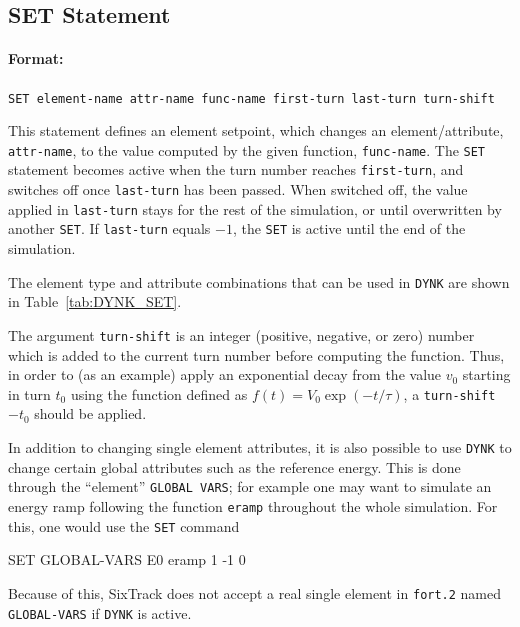 \subsection{SET Statement} \label{DYNK:SET}

\paragraph{Format:} \texttt{SET element-name attr-name func-name first-turn last-turn turn-shift}

\bigskip
This statement defines an element setpoint, which changes an element/attribute, \texttt{attr-name}, to the value computed by the given function, \texttt{func-name}.
The \texttt{SET} statement becomes active when the turn number reaches \texttt{first-turn}, and switches off once \texttt{last-turn} has been passed.
When switched off, the value applied in \texttt{last-turn} stays for the rest of the simulation, or until overwritten by another \texttt{SET}.
If \texttt{last-turn} equals $-1$, the \texttt{SET} is active until the end of the simulation.

The element type and attribute combinations that can be used in \texttt{DYNK} are shown in Table~\ref{tab:DYNK_SET}.

The argument \texttt{turn-shift} is an integer (positive, negative, or zero) number which is added to the current turn number before computing the function.
Thus, in order to (as an example) apply an exponential decay from the value $v_0$ starting in turn $t_0$ using the function defined as $f(t) = V_0 \exp(-t/\tau)$, a \texttt{turn-shift} $-t_0$ should be applied.

In addition to changing single element attributes, it is also possible to use \texttt{DYNK} to change certain global attributes such as the reference energy.
This is done through the ``element'' \texttt{GLOBAL VARS}; for example one may want to simulate an energy ramp following the function \texttt{eramp} throughout the whole simulation.
For this, one would use the \texttt{SET} command
\begin{cverbatim}
SET GLOBAL-VARS E0 eramp 1 -1 0
\end{cverbatim}
Because of this, SixTrack does not accept a real single element in \texttt{fort.2} named \texttt{GLOBAL-VARS} if \texttt{DYNK} is active.

